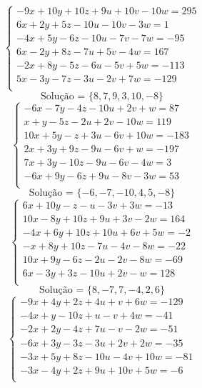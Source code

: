 \documentclass[12pt,oneside,a4paper]{article}
\begin{document}
\vspace{\baselineskip}
\begin{equation*}
\begin{cases}
-9x+10y+10z+9u+10v-10w=295 \\
6x+2y+5z-10u-10v-3w=1 \\
-4x+5y-6z-10u-7v-7w=-95 \\
6x-2y+8z-7u+5v-4w=167 \\
-2x+8y-5z-6u-5v+5w=-113 \\
5x-3y-7z-3u-2v+7w=-129 \\
\end{cases}
\end{equation*}
\begin{equation*}
\text{Solução = }\{8,7,9,3,10,-8\}
\end{equation*}
\vspace{\baselineskip}
\begin{equation*}
\begin{cases}
-6x-7y-4z-10u+2v+w=87 \\
x+y-5z-2u+2v-10w=119 \\
10x+5y-z+3u-6v+10w=-183 \\
2x+3y+9z-9u-6v+w=-197 \\
7x+3y-10z-9u-6v-4w=3 \\
-6x+9y-6z+9u-8v-3w=53 \\
\end{cases}
\end{equation*}
\begin{equation*}
\text{Solução = }\{-6,-7,-10,4,5,-8\}
\end{equation*}
\vspace{\baselineskip}
\begin{equation*}
\begin{cases}
6x+10y-z-u-3v+3w=-13 \\
10x-8y+10z+9u+3v-2w=164 \\
-4x+6y+10z+10u+6v+5w=-2 \\
-x+8y+10z-7u-4v-8w=-22 \\
10x+9y-6z-2u-2v-8w=-69 \\
6x-3y+3z-10u+2v-w=128 \\
\end{cases}
\end{equation*}
\begin{equation*}
\text{Solução = }\{8,-7,7,-4,2,6\}
\end{equation*}
\vspace{\baselineskip}
\begin{equation*}
\begin{cases}
-9x+4y+2z+4u+v+6w=-129 \\
-4x+y-10z+u-v+4w=-41 \\
-2x+2y-4z+7u-v-2w=-51 \\
-6x+3y-3z-3u+2v+2w=-35 \\
-3x+5y+8z-10u-4v+10w=-81 \\
-3x-4y+2z+9u+10v+5w=-6 \\
\end{cases}
\end{equation*}
\end{document}
